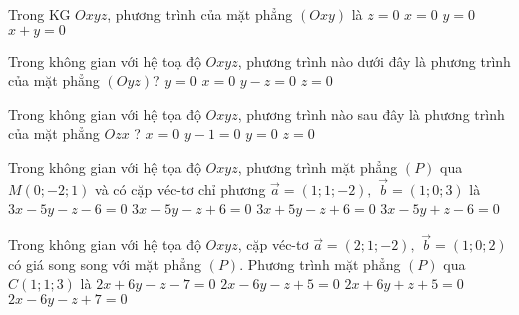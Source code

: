\begin{ex}%
	Trong KG $Oxyz$, phương trình của mặt phẳng $(Oxy)$ là
	\choice
	{\True $z=0$}
	{$x=0$}
	{$y=0$}
	{$x+y=0$}
\end{ex}

\begin{ex}%
	Trong không gian với hệ toạ độ $Oxyz$, phương trình nào dưới đây là phương trình của mặt phẳng $(Oyz)$?
	\choice
	{$y=0$}
	{\True $x=0$}
	{$y-z=0$}
	{$z=0$}
\end{ex}
\begin{ex}%
	Trong không gian với hệ tọa độ $O x y z$, phương trình nào sau đây là phương trình của mặt phẳng $O z x$ ?
	\choice
	{$x=0$}
	{$y-1=0$}
	{\True $y=0$}
	{$z=0$}
\end{ex}

\begin{ex}%
	Trong không gian với hệ tọa độ $O x y z$, phương trình mặt phẳng $(P)$ qua $M(0 ;-2 ; 1)$ và có cặp véc-tơ  chỉ phương $\vec{a}=(1 ; 1 ;-2),$ $ \vec{b}=(1 ; 0 ; 3)$ là
	\choice
	{\True $3 x-5 y-z-6=0$}
	{$3 x-5 y-z+6=0$}
	{$3 x+5 y-z+6=0$}
	{$3 x-5 y+z-6=0$}
\end{ex}
\begin{ex}%
	Trong không gian với hệ tọa độ $O x y z$, cặp véc-tơ  $\vec{a}=(2 ; 1 ;-2), $ $\vec{b}=(1 ; 0 ; 2)$ có giá song song với mặt phẳng $(P)$. Phương trình mặt phẳng $(P)$ qua $C(1 ; 1 ; 3)$ là
	\choice
	{$2 x+6 y-z-7=0$}
	{$2 x-6 y-z+5=0$}
	{$2 x+6 y+z+5=0$}
	{\True $2 x-6 y-z+7=0$}
\end{ex}

